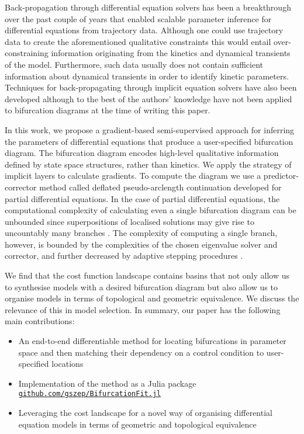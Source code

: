 Back-propagation through differential equation solvers has been a breakthrough over the past couple of years \cite{Chen2018NeuralEquations,Rackauckas2019DiffEqFlux.jl-AEquations} that enabled scalable parameter inference for differential equations from trajectory data. Although one could use trajectory data to create the aforementioned qualitative constraints \cite{Ranciati2017BayesianParameters,Khadivar2021LearningBifurcations} this would entail over-constraining information originating from the kinetics and dynamical transients of the model. Furthermore, such data usually does not contain sufficient information about dynamical transients in order to identify kinetic parameters. Techniques for back-propagating through implicit equation solvers have also been developed \cite{Look2020DifferentiableLayers,Bai2019DeepModels} although to the best of the authors' knowledge have not been applied to bifurcation diagrams at the time of writing this paper.

In this work, we propose a gradient-based semi-supervised approach for inferring the parameters of differential equations that produce a user-specified bifurcation diagram. The bifurcation diagram encodes high-level qualitative information defined by state space structures, rather than kinetics. We apply the strategy of implicit layers \cite{Look2020DifferentiableLayers,Bai2019DeepModels} to calculate gradients. To compute the diagram we use a predictor-corrector method called deflated pseudo-arclength continuation \cite{Farrell2016TheDiagrams,Veltz2019PseudoArcLengthContinuation.jl} developed for partial differential equations. In the case of partial differential equations, the computational complexity of calculating even a single bifurcation diagram can be unbounded since superpositions of localised solutions may give rise to uncountably many branches \cite{Avitabile2010ToEquation}. The complexity of computing a single branch, however, is bounded by the complexities of the chosen eigenvalue solver and corrector, and further decreased by adaptive stepping procedures \cite{Aruliah2016AlgorithmContinuation}.

We find that the cost function landscape contains basins that not only allow us to synthesise models with a desired bifurcation diagram but also allow us to organise models in terms of topological and geometric equivalence. We discuss the relevance of this in model selection. In summary, our paper has the following main contributions:

\begin{itemize}
    \item An end-to-end differentiable method for locating bifurcations in parameter space and then matching their dependency on a control condition to user-specified locations
    \item Implementation of the method as a Julia package\\  \href{https://github.com/gszep/BifurcationFit.jl}{\texttt{github.com/gszep/BifurcationFit.jl}}
    \item Leveraging the cost landscape for a novel way of organising differential equation models in terms of geometric and topological equivalence
\end{itemize}

